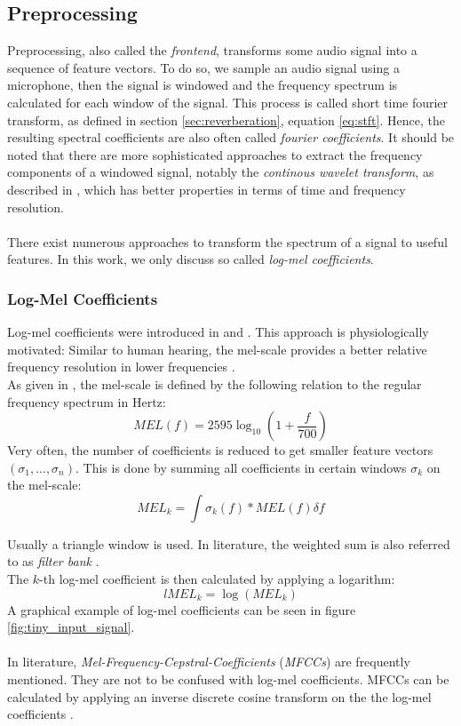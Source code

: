 \subsection{Preprocessing}
Preprocessing, also called the \textit{frontend}, transforms some audio signal into a sequence of feature vectors. To do so, we sample an audio signal using a microphone, then the signal is windowed and the frequency spectrum is calculated for each window of the signal. This process is called short time fourier transform, as defined in section \ref{sec:reverberation}, equation \ref{eq:stft}. Hence, the resulting spectral coefficients are also often called \textit{fourier coefficients}. It should be noted that there are more sophisticated approaches to extract the frequency components of a windowed signal, notably the \textit{continous wavelet transform}, as described in \cite{mallat1999wavelet}, which has better properties in terms of time and frequency resolution. \\ \\
There exist numerous approaches to transform the spectrum of a signal to useful features. In this work, we only discuss so called \textit{log-mel coefficients}. 
\subsubsection{Log-Mel Coefficients}
\label{sec:lmel}
Log-mel coefficients were introduced in \cite{waibel1990phoneme} and \cite{waibel1983comparative}. This approach is physiologically motivated: Similar to human hearing, the mel-scale provides a better relative frequency resolution in lower frequencies \cite{waibel1990phoneme}. \\
As given in \cite{poser1990speech}, the mel-scale is defined by the following relation to the regular frequency spectrum in Hertz: 
\[
MEL(f)=2595\log _{10}\left(1+{\frac {f}{700}}\right)
\]
Very often, the number of coefficients is reduced to get smaller feature vectors $(\sigma_1, ..., \sigma_n)$. This is done by summing all coefficients in certain windows $\sigma_k$ on the mel-scale: 
\[
MEL_k = \int \sigma_k(f) * MEL(f) \delta f 
\]

Usually a triangle window is used. In literature, the weighted sum is also referred to as \textit{filter bank} \cite{zhan1997vocal}. \\
The $k$-th log-mel coefficient is then calculated by applying a logarithm:
\[
lMEL_k = \log(MEL_k) 
\]
A graphical example of log-mel coefficients can be seen in figure \ref{fig:tiny_input_signal}.
\\ \\
In literature, \textit{Mel-Frequency-Cepstral-Coefficients} (\textit{MFCCs}) are frequently mentioned. They are not to be confused with log-mel coefficients. MFCCs can be calculated by applying an inverse discrete cosine transform on the the log-mel coefficients \cite{davis1990comparison}.

